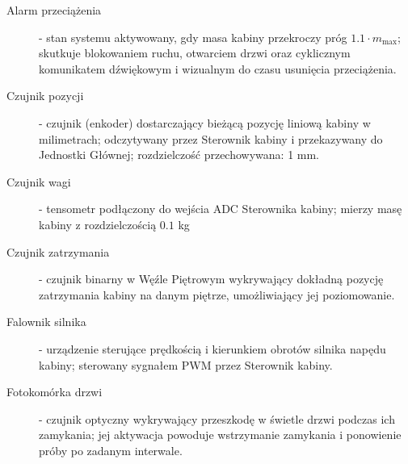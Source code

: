 \documentclass[a4paper,12pt]{article}
\begin{document}
\begin{description}


  \item[Alarm przeciążenia] - stan systemu aktywowany, gdy masa kabiny przekroczy próg $1.1 \cdot m_\text{max}$; skutkuje blokowaniem ruchu, otwarciem drzwi oraz cyklicznym komunikatem dźwiękowym i wizualnym do czasu usunięcia przeciążenia.


  \item[Czujnik pozycji] - czujnik (enkoder) dostarczający bieżącą pozycję liniową kabiny w milimetrach; odczytywany przez Sterownik kabiny i przekazywany do Jednostki Głównej; rozdzielczość przechowywana: 1 mm.

  \item[Czujnik wagi] - tensometr podłączony do wejścia ADC Sterownika kabiny; mierzy masę kabiny z rozdzielczością $0.1$ kg

  \item[Czujnik zatrzymania] - czujnik binarny w Węźle Piętrowym wykrywający dokładną pozycję zatrzymania kabiny na danym piętrze, umożliwiający jej poziomowanie.


  \item[Falownik silnika] - urządzenie sterujące prędkością i kierunkiem obrotów silnika napędu kabiny; sterowany sygnałem PWM przez Sterownik kabiny.

  \item[Fotokomórka drzwi] - czujnik optyczny wykrywający przeszkodę w świetle drzwi podczas ich zamykania; jej aktywacja powoduje wstrzymanie zamykania i ponowienie próby po zadanym interwale.



\end{description}
\end{document}
